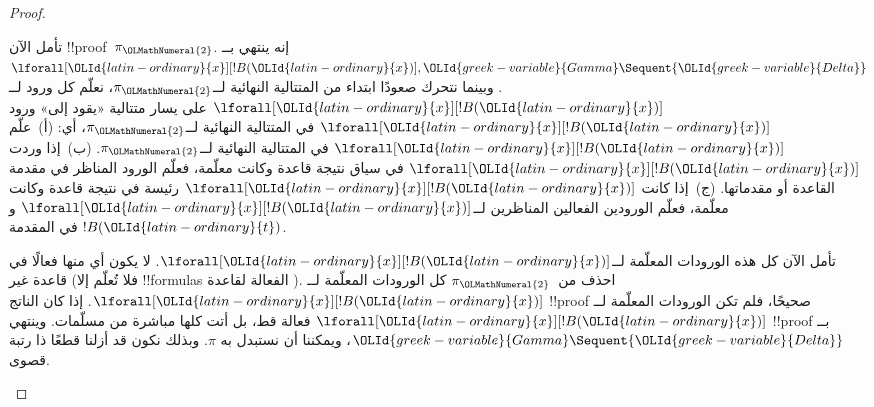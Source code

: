 \documentclass[../../../include/open-logic-section]{subfiles}
\begin{document}
\begin{proof}
\begin{enumerate}
  تأمل الآن !!{proof}~$\pi_{\OLMathNumeral{2}}$. إنه ينتهي بــ$\lforall[{\OLId{latin-ordinary}{x}}][!B({\OLId{latin-ordinary}{x}})],
  {\OLId{greek-variable}{Gamma}} \Sequent {\OLId{greek-variable}{Delta}}$. وبينما نتحرك صعودًا ابتداء من المتتالية النهائية
  لــ$\pi_{\OLMathNumeral{2}}$، نعلّم كل ورود لــ$\lforall[{\OLId{latin-ordinary}{x}}][!B({\OLId{latin-ordinary}{x}})]$ على يسار متتالية «يقود
  إلى» ورود $\lforall[{\OLId{latin-ordinary}{x}}][!B({\OLId{latin-ordinary}{x}})]$ في المتتالية النهائية لــ$\pi_{\OLMathNumeral{2}}$، أي:
  (أ)~علّم $\lforall[{\OLId{latin-ordinary}{x}}][!B({\OLId{latin-ordinary}{x}})]$ في المتتالية النهائية لــ$\pi_{\OLMathNumeral{2}}$.
  (ب)~إذا وردت $\lforall[{\OLId{latin-ordinary}{x}}][!B({\OLId{latin-ordinary}{x}})]$ في سياق نتيجة قاعدة وكانت معلّمة،
  فعلّم الورود المناظر في مقدمة القاعدة أو مقدماتها. (ج)~إذا كانت
  $\lforall[{\OLId{latin-ordinary}{x}}][!B({\OLId{latin-ordinary}{x}})]$ رئيسة في نتيجة قاعدة \LeftR{\lforall} وكانت معلّمة،
  فعلّم الورودين الفعالين المناظرين لــ$\lforall[{\OLId{latin-ordinary}{x}}][!B({\OLId{latin-ordinary}{x}})]$ و$!B({\OLId{latin-ordinary}{t}})$ في
  المقدمة.

  تأمل الآن كل هذه الورودات المعلّمة لــ$\lforall[{\OLId{latin-ordinary}{x}}][!B({\OLId{latin-ordinary}{x}})]$. لا يكون أي
  منها فعالًا في قاعدة غير \LeftR{\lforall} (فلا تُعلّم إلا !!{formula}s
  الفعالة لقاعدة \LeftR{\lforall}). احذف من~$\pi_{\OLMathNumeral{2}}$ كل الورودات المعلّمة
  لــ$\lforall[{\OLId{latin-ordinary}{x}}][!B({\OLId{latin-ordinary}{x}})]$.
  إذا كان الناتج !!{proof} صحيحًا، فلم تكن الورودات المعلّمة لــ
  $\lforall[{\OLId{latin-ordinary}{x}}][!B({\OLId{latin-ordinary}{x}})]$ فعالة قط، بل أتت كلها مباشرة من مسلّمات. وينتهي
  !!{proof} بــ${\OLId{greek-variable}{Gamma}} \Sequent {\OLId{greek-variable}{Delta}}$، ويمكننا أن نستبدل به $\pi$.
  وبذلك نكون قد أزلنا قطعًا ذا رتبة قصوى.


\end{enumerate}
\end{proof}
\end{document}
